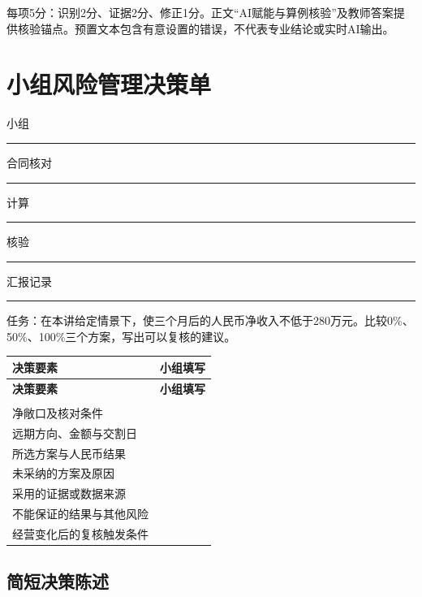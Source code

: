 \documentclass[lang=cn,11pt,oneside,openany,chinesefont=nofont,color=blue,titlestyle=hang]{elegantbook}
\begin{document}
每项5分：识别2分、证据2分、修正1分。正文“AI赋能与算例核验”及教师答案提供核验锚点。预置文本包含有意设置的错误，不代表专业结论或实时AI输出。

\clearpage

\section{小组风险管理决策单}\label{sec:g15}

小组\rule{2cm}{.3pt}  合同核对\rule{2cm}{.3pt}  计算\rule{2cm}{.3pt}  核验\rule{2cm}{.3pt}  汇报记录\rule{2cm}{.3pt}

任务：在本讲给定情景下，使三个月后的人民币净收入不低于280万元。比较0\%、50\%、100\%三个方案，写出可以复核的建议。

\begingroup\small{}\setlength{\tabcolsep}{6pt}\renewcommand{\arraystretch}{1.24}
\begin{longtable}{>{\raggedright\arraybackslash}p{}>{\raggedright\arraybackslash}p{}}
\toprule[.8pt]\rowcolor{Navy}
\color{white}\bfseries 决策要素 & \color{white}\bfseries 小组填写 \\
\midrule\endfirsthead
\toprule[.8pt]\rowcolor{Navy}
\color{white}\bfseries 决策要素 & \color{white}\bfseries 小组填写 \\
\midrule\endhead
\midrule\multicolumn{2}{r}{\footnotesize\color{Muted}续下页}\\\endfoot
\bottomrule[.8pt]\endlastfoot
净敞口及核对条件 & \rule{0pt}{9mm} \\
\midrule[.25pt]
\rowcolor{Pale}
远期方向、金额与交割日 & \rule{0pt}{9mm} \\
\midrule[.25pt]
所选方案与人民币结果 & \rule{0pt}{9mm} \\
\midrule[.25pt]
\rowcolor{Pale}
未采纳的方案及原因 & \rule{0pt}{9mm} \\
\midrule[.25pt]
采用的证据或数据来源 & \rule{0pt}{9mm} \\
\midrule[.25pt]
\rowcolor{Pale}
不能保证的结果与其他风险 & \rule{0pt}{9mm} \\
\midrule[.25pt]
经营变化后的复核触发条件 & \rule{0pt}{9mm} \\
\midrule[.25pt]
\end{longtable}\endgroup

\subsection*{简短决策陈述}
\end{document}
